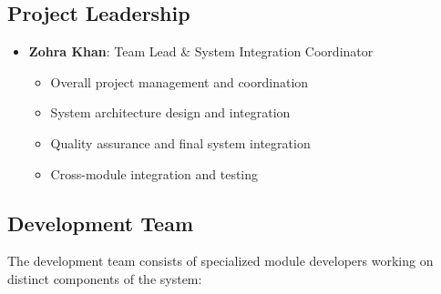 \documentclass[12pt,a4paper]{article}
\begin{document}
\subsection{Project Leadership}
\begin{itemize}
    \item \textbf{Zohra Khan}: Team Lead \& System Integration Coordinator
    \begin{itemize}
        \item Overall project management and coordination
        \item System architecture design and integration
        \item Quality assurance and final system integration
        \item Cross-module integration and testing
    \end{itemize}
\end{itemize}

\subsection{Development Team}

The development team consists of specialized module developers working on distinct components of the system:
\end{document}
